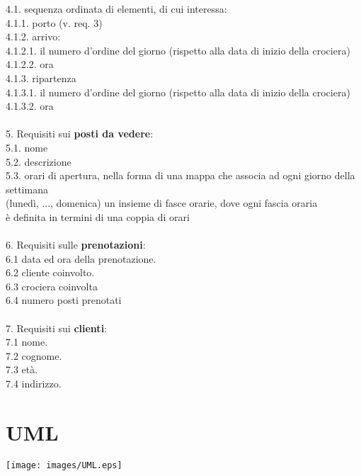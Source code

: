 \documentclass[12pt, letterpaper]{article}
\newcommand{\acc}{\\\hphantom{}\\}
\begin{document}
\hphantom{ident}4.1. sequenza ordinata di elementi, di cui interessa:\\
\hphantom{ident}\hphantom{ident}4.1.1. porto (v. req. 3)\\
\hphantom{ident}\hphantom{ident}4.1.2. arrivo:\\
\hphantom{ident}\hphantom{ident}\hphantom{ident}4.1.2.1. il numero d'ordine del giorno (rispetto alla data di inizio della crociera)\\
\hphantom{ident}\hphantom{ident}\hphantom{ident}4.1.2.2. ora\\
\hphantom{ident}\hphantom{ident}4.1.3. ripartenza	\\
\hphantom{ident}\hphantom{ident}\hphantom{ident}4.1.3.1. il numero d'ordine del giorno (rispetto alla data di inizio della crociera)\\
\hphantom{ident}\hphantom{ident}\hphantom{ident}4.1.3.2. ora
\acc
5. Requisiti sui \textbf{posti da vedere}:\\
\hphantom{ident}5.1. nome\\
\hphantom{ident}5.2. descrizione\\
\hphantom{ident}5.3. orari di apertura, nella forma di una mappa che associa ad ogni giorno della settimana\\
\hphantom{ident}\hphantom{ident}(lunedì, ..., domenica) un insieme di fasce orarie, dove ogni fascia oraria\\
\hphantom{ident}\hphantom{ident}è definita in termini di una coppia di orari\acc
6. Requisiti sulle \textbf{prenotazioni}:\\
\hphantom{ident}6.1 data ed ora della prenotazione.\\
\hphantom{ident}6.2 cliente coinvolto.\\
\hphantom{ident}6.3 crociera coinvolta\\
\hphantom{ident}6.4 numero posti prenotati\acc
7. Requisiti sui \textbf{clienti}:\\
\hphantom{ident}7.1 nome.\\
\hphantom{ident}7.2 cognome.\\ 
\hphantom{ident}7.3 età.\\ 
\hphantom{ident}7.4 indirizzo.
\newpage
\section{UML}\begin{center}
    
    \texttt{[image: images/UML.eps]}
\end{center}
\newpage 
\end{document}

